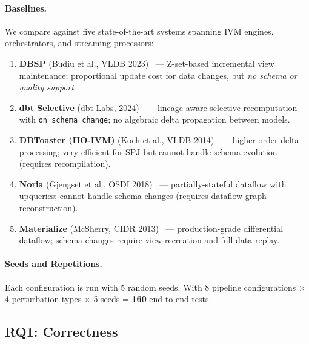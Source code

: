 \documentclass[sigplan,screen,nonacm]{acmart}
\begin{document}
\paragraph{Baselines.}
We compare against five state-of-the-art systems spanning IVM engines,
orchestrators, and streaming processors:
\begin{enumerate}
\item \textbf{DBSP} (Budiu et al., VLDB 2023)~\cite{budiu2023dbsp} ---
  Z-set-based incremental view maintenance; proportional update cost for
  data changes, but \emph{no schema or quality support}.
\item \textbf{dbt Selective} (dbt Labs, 2024)~\cite{dbt2023} ---
  lineage-aware selective recomputation with \texttt{on\_schema\_change};
  no algebraic delta propagation between models.
\item \textbf{DBToaster (HO-IVM)} (Koch et al., VLDB 2014)~\cite{koch2014dbtoaster}
  --- higher-order delta processing; very efficient for SPJ but cannot
  handle schema evolution (requires recompilation).
\item \textbf{Noria} (Gjengset et al., OSDI 2018)~\cite{gjengset2018noria}
  --- partially-stateful dataflow with upqueries; cannot handle schema
  changes (requires dataflow graph reconstruction).
\item \textbf{Materialize} (McSherry, CIDR 2013)~\cite{mcsherry2013differential}
  --- production-grade differential dataflow; schema changes require
  view recreation and full data replay.
\end{enumerate}

\paragraph{Seeds and Repetitions.}
Each configuration is run with 5 random seeds.  With 8 pipeline
configurations $\times$ 4 perturbation types $\times$ 5 seeds = \textbf{160} end-to-end tests.

\subsection{RQ1: Correctness}
\end{document}

